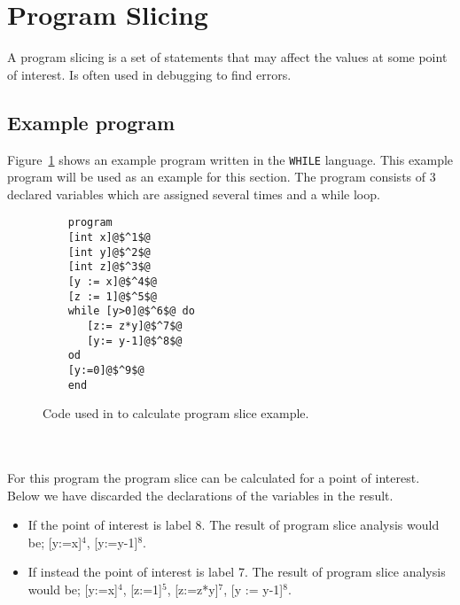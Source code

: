 \section{Program Slicing}
A program slicing is a set of statements that may affect the values at some point of interest. Is often used in debugging to find errors.

\subsection{Example program}\label{sec:exampleprogram}
Figure~\ref{fig:codeexample} shows an example program written in the \texttt{WHILE} language. This example program will be used as an example for this section. The program consists of 3 declared variables which are assigned several times and a while loop.
\begin{figure}
	\begin{lstlisting}
	program
	[int x]@$^1$@
	[int y]@$^2$@
	[int z]@$^3$@
	[y := x]@$^4$@
	[z := 1]@$^5$@
	while [y>0]@$^6$@ do
	   [z:= z*y]@$^7$@
	   [y:= y-1]@$^8$@
	od
	[y:=0]@$^9$@
	end
	\end{lstlisting}
	\caption{Code used in to calculate program slice example.}
	\label{fig:codeexample}
\end{figure}
\\\\
For this program the program slice can be calculated for a point of interest. Below we have discarded the declarations of the variables in the result.
\begin{itemize}
	\item If the point of interest is label 8. The result of program slice analysis would be; [y:=x]$^4$, [y:=y-1]$^8$.
	\item If instead the point of interest is label 7.  The result of program slice analysis would be; [y:=x]$^4$, [z:=1]$^5$, [z:=z*y]$^7$, [y := y-1]$^8$.
\end{itemize}

